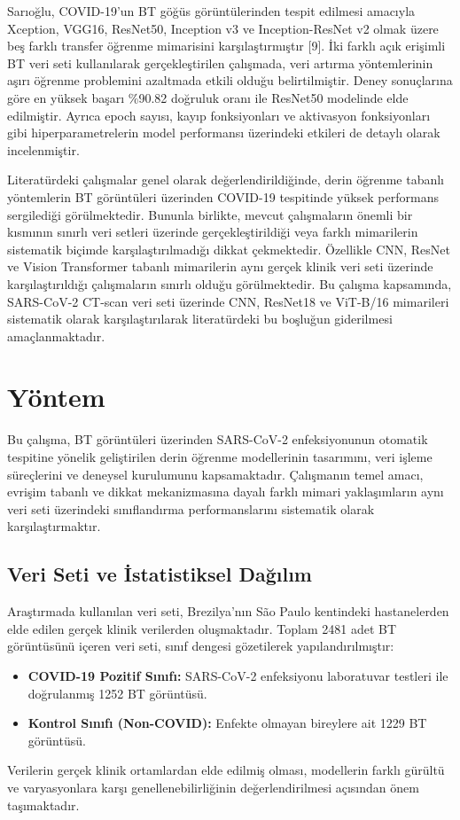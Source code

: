 \documentclass[conference]{IEEEtran}
\begin{document}
Sarıoğlu, COVID-19'un BT göğüs görüntülerinden tespit edilmesi amacıyla Xception, VGG16, ResNet50, Inception v3 ve Inception-ResNet v2 olmak üzere beş farklı transfer öğrenme mimarisini karşılaştırmıştır [9]. İki farklı açık erişimli BT veri seti kullanılarak gerçekleştirilen çalışmada, veri artırma yöntemlerinin aşırı öğrenme problemini azaltmada etkili olduğu belirtilmiştir. Deney sonuçlarına göre en yüksek başarı \%90.82 doğruluk oranı ile ResNet50 modelinde elde edilmiştir. Ayrıca epoch sayısı, kayıp fonksiyonları ve aktivasyon fonksiyonları gibi hiperparametrelerin model performansı üzerindeki etkileri de detaylı olarak incelenmiştir.

Literatürdeki çalışmalar genel olarak değerlendirildiğinde, derin öğrenme tabanlı yöntemlerin BT görüntüleri üzerinden COVID-19 tespitinde yüksek performans sergilediği görülmektedir. Bununla birlikte, mevcut çalışmaların önemli bir kısmının sınırlı veri setleri üzerinde gerçekleştirildiği veya farklı mimarilerin sistematik biçimde karşılaştırılmadığı dikkat çekmektedir. Özellikle CNN, ResNet ve Vision Transformer tabanlı mimarilerin aynı gerçek klinik veri seti üzerinde karşılaştırıldığı çalışmaların sınırlı olduğu görülmektedir. Bu çalışma kapsamında, SARS-CoV-2 CT-scan veri seti üzerinde CNN, ResNet18 ve ViT-B/16 mimarileri sistematik olarak karşılaştırılarak literatürdeki bu boşluğun giderilmesi amaçlanmaktadır.


\section{Yöntem}
Bu çalışma, BT görüntüleri üzerinden SARS-CoV-2 enfeksiyonunun otomatik tespitine yönelik geliştirilen derin öğrenme modellerinin tasarımını, veri işleme süreçlerini ve deneysel kurulumunu kapsamaktadır. Çalışmanın temel amacı, evrişim tabanlı ve dikkat mekanizmasına dayalı farklı mimari yaklaşımların aynı veri seti üzerindeki sınıflandırma performanslarını sistematik olarak karşılaştırmaktır.

\subsection{Veri Seti ve İstatistiksel Dağılım}
Araştırmada kullanılan veri seti, Brezilya'nın São Paulo kentindeki hastanelerden elde edilen gerçek klinik verilerden oluşmaktadır. Toplam 2481 adet BT görüntüsünü içeren veri seti, sınıf dengesi gözetilerek yapılandırılmıştır:
\begin{itemize}
    \item \textbf{COVID-19 Pozitif Sınıfı:} SARS-CoV-2 enfeksiyonu laboratuvar testleri ile doğrulanmış 1252 BT görüntüsü.
    \item \textbf{Kontrol Sınıfı (Non-COVID):} Enfekte olmayan bireylere ait 1229 BT görüntüsü.
\end{itemize}
Verilerin gerçek klinik ortamlardan elde edilmiş olması, modellerin farklı gürültü ve varyasyonlara karşı genellenebilirliğinin değerlendirilmesi açısından önem taşımaktadır.
\end{document}
